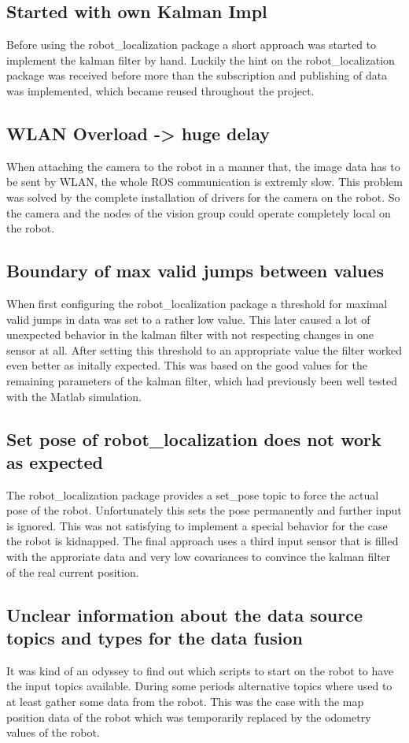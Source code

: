 \subsection{Started with own Kalman Impl}
Before using the robot\_localization package a short approach was started to implement the kalman filter by hand. Luckily the hint on the robot\_localization package was received before more than the subscription and publishing of data was implemented, which became reused throughout the project.
\subsection{WLAN Overload -> huge delay}
When attaching the camera to the robot in a manner that, the image data has to be sent by WLAN, the whole ROS communication is extremly slow. This problem was solved by the complete installation of drivers for the camera on the robot. So the camera and the nodes of the vision group could operate completely local on the robot.
\subsection{Boundary of max valid jumps between values}
When first configuring the robot\_localization package a threshold for maximal valid jumps in data was set to a rather low value. This later caused a lot of unexpected behavior in the kalman filter with not respecting changes in one sensor at all. After setting this threshold to an appropriate value the filter worked even better as initally expected. This was based on the good values for the remaining parameters of the kalman filter, which had previously been well tested with the Matlab simulation.
\subsection{Set pose of robot\_localization does not work as expected}
The robot\_localization package provides a set\_pose topic to force the actual pose of the robot. Unfortunately this sets the pose permanently and further input is ignored. This was not satisfying to implement a special behavior for the case the robot is kidnapped. The final approach uses a third input sensor that is filled with the approriate data and very low covariances to convince the kalman filter of the real current position.
\subsection{Unclear information about the data source topics and types for the data fusion}
It was kind of an odyssey to find out which scripts to start on the robot to have the input topics available. During some periods alternative topics where used to at least gather some data from the robot. This was the case with the map position data of the robot which was temporarily replaced by the odometry values of the robot.